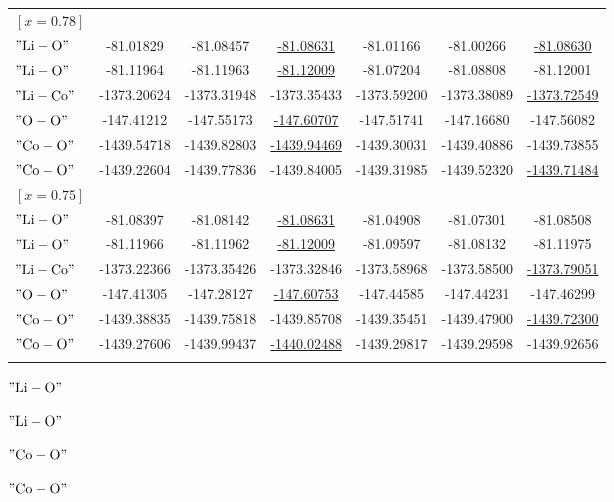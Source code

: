 \documentclass[pdflatex,sn-mathphys-num]{sn-jnl}%
\theoremstyle{thmstyleone}%
\theoremstyle{thmstyletwo}%
\theoremstyle{thmstylethree}%
\begin{document}
\begin{table}
\begin{tabular*}{\textwidth}{@{\extracolsep\fill}lcccccc}
$\left[x=0.78\right]$ &  &  &  &  &  & \\[4pt]
$\mathrm{"Li-O"}$\footnotemark[1] & -81.01829 & -81.08457 & \underline{-81.08631} & -81.01166 & -81.00266 & \underline{-81.08630} \\
$\mathrm{"Li-O"}$\footnotemark[2] & -81.11964 & -81.11963 & \underline{-81.12009} & -81.07204 & -81.08808 & -81.12001 \\
$\mathrm{"Li-Co"}$ & -1373.20624 & -1373.31948 & -1373.35433 & -1373.59200 & -1373.38089 & \underline{-1373.72549} \\
$\mathrm{"O-O"}$ & -147.41212 & -147.55173 & \underline{-147.60707} & -147.51741 & -147.16680 & -147.56082 \\
$\mathrm{"Co-O"}$\footnotemark[1] & -1439.54718 & -1439.82803 & \underline{-1439.94469} & -1439.30031 & -1439.40886 & -1439.73855 \\
$\mathrm{"Co-O"}$\footnotemark[2] & -1439.22604 & -1439.77836 & -1439.84005 & -1439.31985 & -1439.52320 & \underline{-1439.71484} \\ [8pt]

$\left[x=0.75\right]$ &  &  &  &  &  & \\[4pt]
$\mathrm{"Li-O"}$\footnotemark[1] & -81.08397 & -81.08142 & \underline{-81.08631} & -81.04908 & -81.07301 & -81.08508 \\
$\mathrm{"Li-O"}$\footnotemark[2] & -81.11966 & -81.11962 & \underline{-81.12009} & -81.09597 & -81.08132 & -81.11975 \\
$\mathrm{"Li-Co"}$ & -1373.22366 & -1373.35426 & -1373.32846 & -1373.58968 & -1373.58500 & \underline{-1373.79051} \\
$\mathrm{"O-O"}$ & -147.41305 & -147.28127 & \underline{-147.60753} & -147.44585 & -147.44231 & -147.46299 \\
$\mathrm{"Co-O"}$\footnotemark[1] & -1439.38835 & -1439.75818 & -1439.85708 & -1439.35451 & -1439.47900 & \underline{-1439.72300} \\
$\mathrm{"Co-O"}$\footnotemark[2] & -1439.27606 & -1439.99437 & \underline{-1440.02488} & -1439.29817 & -1439.29598 & -1439.92656 \\
\botrule
\end{tabular*}
$\mathrm{"Li-O"}$

$\mathrm{"Li-O"}$

$\mathrm{"Co-O"}$

$\mathrm{"Co-O"}$
\end{table}
\end{document}
